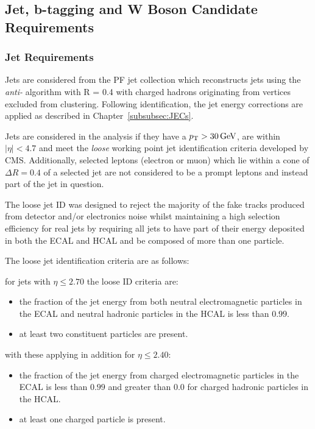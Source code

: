 \subsection{Jet, b-tagging and W Boson Candidate Requirements}
\subsubsection{Jet Requirements}
Jets are considered from the PF jet collection which reconstructs jets using the \emph{anti-\kt} algorithm with R = 0.4 with charged hadrons originating from \PU vertices excluded from clustering.
Following identification, the jet energy corrections are applied as described in Chapter~\ref{subsubsec:JECs}.

Jets are considered in the analysis if they have a $p_{\mathrm{T}} > 30\,\text{Ge\hspace{-.08em}V}$, are within $|\eta| < 4.7$ and meet the \emph{loose} working point jet identification criteria developed by CMS.
Additionally, selected leptons (electron or muon) which lie within a cone of $\Delta R = 0.4$ of a selected jet are not considered to be a prompt leptons and instead part of the jet in question.

The loose jet ID was designed to reject the majority of the fake tracks produced from detector and/or electronics noise whilst maintaining a high selection efficiency for real jets by requiring all jets to have part of their energy deposited in both the ECAL and HCAL and be composed of more than one particle.

The loose jet identification criteria are as follows:

for jets with $\eta \leq 2.70$ the loose ID criteria are:
\begin{itemize}
\item the fraction of the jet energy from both neutral electromagnetic particles in the ECAL and neutral hadronic particles in the HCAL is less than $0.99$.
\item at least two constituent particles are present.
\end{itemize}

with these applying in addition for $\eta \leq 2.40$:
\begin{itemize}
\item the fraction of the jet energy from charged electromagnetic particles in the ECAL is less than $0.99$ and greater than 0.0 for charged hadronic particles in the HCAL.
\item at least one charged particle is present.
\end{itemize}


